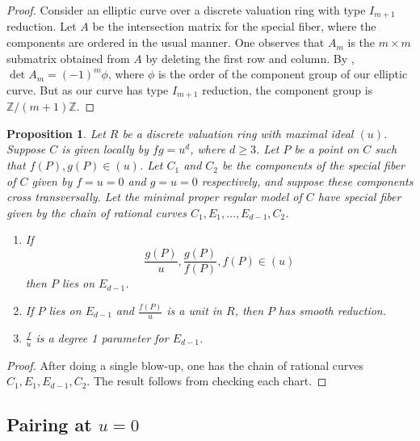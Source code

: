 \documentclass[reqno]{amsart}
\newtheorem{proposition}[thm]{Proposition}
\theoremstyle{definition}
\theoremstyle{remark}
\def\Z{\mathbb{Z}}
\begin{document}
\begin{proof}
  Consider an elliptic curve over a discrete valuation ring with type $I_{m+1}$ reduction. Let $A$ be the intersection matrix for the special fiber, where the components are ordered in the usual manner. One observes that $A_m$ is the $m \times m$ submatrix obtained from $A$ by deleting the first row and column. By \cite[Corollary~1.3]{lorenzini}, $\det A_m = (-1)^m \phi$, where $\phi$ is the order of the component group of our elliptic curve. But as our curve has type $I_{m+1}$ reduction, the component group is $\Z/(m+1)\Z$.
\end{proof}

\begin{proposition}\label{prop:fg-equals-u-blow-up}
  Let $R$ be a discrete valuation ring with maximal ideal $(u)$. Suppose $C$ is given locally by $fg = u^d$, where $d \geq 3$. Let $P$ be a point on $C$ such that $f(P), g(P) \in (u)$. Let $C_1$ and $C_2$ be the components of the special fiber of $C$ given by $f = u = 0$ and $g = u = 0$ respectively, and suppose these components cross transversally. Let the minimal proper regular model of $C$ have special fiber given by the chain of rational curves $C_1, E_1, \dots, E_{d-1}, C_2$.
  \begin{enumerate}
      \item  If
  \[
  \frac{g(P)}{u}, \frac{g(P)}{f(P)}, f(P) \in (u)
  \]
  then $P$ lies on $E_{d-1}$.
    \item If $P$ lies on $E_{d-1}$ and $\frac{f(P)}{u}$ is a unit in $R$, then $P$ has smooth reduction.
    \item $\frac{f}{u}$ is a degree 1 parameter for $E_{d-1}$.
  \end{enumerate}
\end{proposition}

\begin{proof}
  After doing a single blow-up, one has the chain of rational curves $C_1, E_1, E_{d-1}, C_2$. The result follows from checking each chart.
\end{proof}

\subsection{Pairing at $u = 0$}
\label{sec:pairing-at-u}
\end{document}
